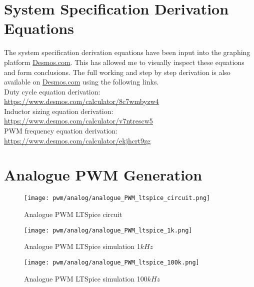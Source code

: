 


% 


\chapter{System Specification Derivation Equations} \label{A:specs}

The system specification derivation equations have been input into the graphing platform \url{Desmos.com}. This has allowed me to visually inspect these equations and form conclusions. The full working and step by step derivation is also available on \url{Desmos.com} using the following links.\\

Duty cycle equation derivation:\\
\url{https://www.desmos.com/calculator/8c7wmbyzw4}\\

Inductor sizing equation derivation:\\ 
\url{https://www.desmos.com/calculator/v7ntrescw5}\\

PWM frequency equation derivation:\\ 
\url{https://www.desmos.com/calculator/ekjhcrt9zg}\\

\chapter{Analogue PWM Generation} \label{A:analogue_PWM}


\begin{figure}[H]
    \texttt{[image: pwm/analog/analogue\_PWM\_ltspice\_circuit.png]}
    \caption{Analogue PWM LTSpice circuit}
\end{figure}

\begin{figure}[H]
    \texttt{[image: pwm/analog/analogue\_PWM\_ltspice\_1k.png]}
    \caption{Analogue PWM LTSpice simulation 1$kHz$}
\end{figure}

\begin{figure}[H]
    \texttt{[image: pwm/analog/analogue\_PWM\_ltspice\_100k.png]}
    \caption{Analogue PWM LTSpice simulation 100$kHz$}
\end{figure}


